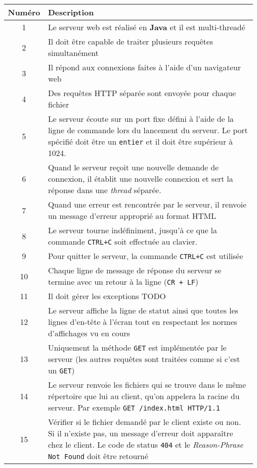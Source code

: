 \documentclass[a4paper, 11pt]{article}
\begin{document}
\begin{tabular}{ c | p{14cm} }
Numéro & Description \\
\hline
\hline
1  & Le serveur web est réalisé en \textbf{Java} et il est multi-threadé \\
2  & Il doit être capable de traiter plusieurs requêtes simultanément \\
3  & Il répond aux connexions faites à l'aide d'un navigateur web \\
4  & Des requêtes HTTP séparée sont envoyée pour chaque fichier\\
5  & Le serveur écoute sur un port fixe défini à l'aide de la ligne de commande
     lors du lancement du serveur. Le port spécifié doit être un \texttt{entier} 
     et il doit être supérieur à 1024.\\
6  & Quand le serveur reçoit une nouvelle demande de connexion, il établit une
     nouvelle connexion et sert la réponse dans une \emph{thread} séparée. \\
7  & Quand une erreur est rencontrée par le serveur, il renvoie un message 
     d'erreur approprié au format HTML \\
8  & Le serveur tourne indéfiniment, jusqu'à ce que la commande \texttt{CTRL+C}
     soit effectuée au clavier. \\
9  & Pour quitter le serveur, la commande \texttt{CTRL+C} est utilisée \\
10 & Chaque ligne de message de réponse du serveur se termine avec un retour à
     la ligne (\texttt{CR + LF}) \\
11 & Il doit gérer les exceptions TODO \\
12 & Le serveur affiche la ligne de statut ainsi que toutes les lignes d'en-tête 
     à l'écran tout en respectant les normes d'affichages vu en cours \\
13 & Uniquement la méthode \texttt{GET} est implémentée par le serveur (les autres
     requêtes sont traitées comme si c'est un \texttt{GET}) \\
14 & Le serveur renvoie les fichiers qui se trouve dans le même répertoire que lui
     au client, qu'on appelera la racine du serveur. Par exemple 
     \texttt{GET /index.html HTTP/1.1} \\
15 & Vérifier si le fichier demandé par le client existe ou non. Si il n'existe 
     pas, un message d'erreur doit apparaître chez le client. Le code de status
     \texttt{404} et le \emph{Reason-Phrase} \texttt{Not Found} doit être 
     retourné \\

\end{tabular}
\end{document}
